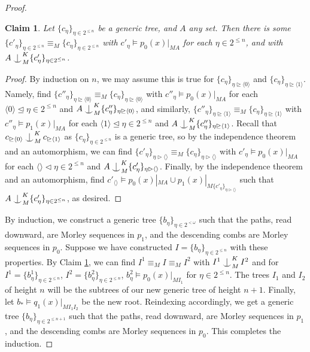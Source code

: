 \documentclass[12pt]{amsart}
\newtheorem{claim}[theorem]{Claim}
\theoremstyle{definition}
\def\Ind#1#2{#1\setbox0=\hbox{$#1x$}\kern\wd0\hbox to 0pt{\hss$#1\mid$\hss}
\lower.9\ht0\hbox to 0pt{\hss$#1\smile$\hss}\kern\wd0}
\def\ind{\mathop{\mathpalette\Ind{}}}
\begin{document}
\begin{proof}
    \begin{claim}\label{4-gtree}
        Let $\{c_{\eta}\}_{\eta \in 2^{\leq n}}$ be a generic tree, and $A$ any set. Then there is some $\{c'_{\eta}\}_{\eta \in 2^{\leq n}} \equiv_{M} \{c_{\eta}\}_{\eta \in 2^{\leq n}}$ with $c'_{\eta} \models p_{0}(x)|_{MA}$ for each $\eta \in 2^{\leq n}$, and with $A \ind_{M}^{K} \{c'_{\eta}\}_{\eta \in 2^{\leq n}}$.
    \end{claim}

    \begin{proof}
        By induction on $n$, we may assume this is true for $\{c_{\eta}\}_{\eta \unrhd \langle 0 \rangle}$ and $\{c_{\eta}\}_{\eta \unrhd \langle 1 \rangle}$. Namely, find $\{c''_{\eta}\}_{\eta \unrhd \langle 0 \rangle} \equiv_{M}\{c_{\eta}\}_{\eta \unrhd \langle 0 \rangle}$  with $c''_{\eta} \models p_{0}(x)|_{MA}$ for each $\langle 0 \rangle \unlhd \eta \in 2^{\leq n}$ and $A \ind^{K}_{M} \{c''_{\eta}\}_{\eta \unrhd \langle 0 \rangle}$, and similarly, $\{c''_{\eta}\}_{\eta \unrhd \langle 1 \rangle} \equiv_{M}\{c_{\eta}\}_{\eta \unrhd \langle 1 \rangle}$  with $c''_{\eta} \models p_{1}(x)|_{MA}$ for each $\langle 1 \rangle \unlhd \eta \in 2^{\leq n}$ and $A \ind^{K}_{M} \{c''_{\eta}\}_{\eta \unrhd \langle 1 \rangle}$. Recall that $c_{\unrhd  \langle 0 \rangle } \ind^{K}_{M} c_{\unrhd \langle 1 \rangle }$ as $\{c_{\eta}\}_{\eta \in 2^{\leq n}}$ is a generic tree, so by the independence theorem and an automorphism, we can find $\{c'_{\eta}\}_{\eta \rhd  \langle \rangle } \equiv_{M}\{c_{\eta}\}_{\eta \rhd \langle \rangle}$ with $c'_{\eta} \models p_{0}(x)|_{MA}$ for each $\langle  \rangle \lhd \eta \in 2^{\leq n}$ and $A \ind^{K}_{M} \{c'_{\eta}\}_{\eta \rhd \langle  \rangle}$. Finally, by the independence theorem and an automorphism, find $c'_{\langle \rangle} \models p_{0} (x)|_{MA} \cup p_{1}(x)|_{M \{c'_{\eta}\}_{\eta \rhd  \langle \rangle }}$ such that $A \ind_{M}^{K} \{c'_{\eta}\}_{\eta \in 2^{\leq n}}$, as desired.
    \end{proof}


 
  

By induction, we construct a generic tree $\{b_{\eta}\}_{\eta \in 2^{<\omega}}$ such that the paths, read downward, are Morley sequences in $p_{1}$, and the descending combs are Morley sequences in $p_{0}$. Suppose we have constructed $I=\{b_{\eta}\}_{\eta \in 2^{\leq n}}$ with these properties. By Claim \ref{4-gtree}, we can find $I^{1} \equiv_{M} I \equiv_{M} I^{2}$ with $I^{1} \ind^{K}_{M} I^{2}$ and for $I^{1}=\{b^{1}_{\eta}\}_{\eta \in 2^{\leq n}}$, $I^{2}=\{b^{2}_{\eta}\}_{\eta \in 2^{\leq n}}$, $b^{2}_{\eta} \models p_{0}(x)|_{MI_{1}}$ for $\eta \in 2^{\leq n}$. The trees $I_{1}$ and $I_{2}$ of height $n$ will be the subtrees of our new generic tree of height $n+1$. Finally, let $b_{*} \models q_{1}(x)|_{MI_{1}I_{2}}$ be the new root. Reindexing accordingly, we get a generic tree $\{b_{\eta}\}_{\eta \in 2^{\leq n+1}}$ such that the paths, read downward, are Morley sequences in $p_{1}$, and the descending combs are Morley sequences in $p_{0}$. This completes the induction.


\end{proof}
\end{document}
